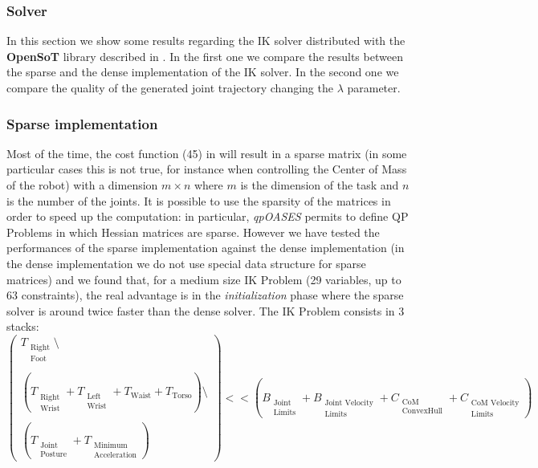 \subsubsection{Solver}
In this section we show some results regarding the IK solver distributed with the \textbf{OpenSoT} library described in \cite{rocchimingo:16}. In the first one we compare the results between the sparse and the dense implementation of the IK solver. In the second one we compare the quality of the generated joint trajectory changing the $\lambda$ parameter. 

\subsubsection{Sparse implementation}
Most of the time, the cost function (45) in \cite{rocchimingo:16}
will result in a sparse matrix (in some particular cases this is not true, for instance when controlling the Center of Mass of the robot) with a dimension $m \times n$ where $m$ is the dimension of the task and $n$ is the number of the joints.  
It is possible to use the sparsity of the matrices in order to speed up the computation: in particular, \emph{qpOASES} permits to define QP Problems in which Hessian matrices are sparse. However we have tested the performances of the sparse implementation against the dense implementation (in the dense implementation we do not use special data structure for sparse matrices) and we found that, for a medium size IK Problem (29 variables, up to 63 constraints), the real advantage is in the \emph{initialization} phase where the sparse solver is around twice faster than the dense solver. The IK Problem consists in 3 stacks: 
\begin{equation}
\begin{pmatrix}
T_{\substack{\text{Right}\\\text{Foot}}}\setminus\\
\\
\left(T_{\substack{\text{Right}\\\text{Wrist}}} + T_{\substack{\text{Left}\\\text{Wrist}}} + T_\text{Waist} + T_\text{Torso}\right)\setminus\\ 
\\
\left(T_{\substack{\text{Joint}\\\text{Posture}}} + T_{\substack{\text{Minimum}\\\text{Acceleration}}}\right)
\end{pmatrix}
<< \left(B_{\substack{\text{Joint}\\\text{Limits}}} + B_{\substack{\text{Joint Velocity}\\\text{Limits}}} + C_{\substack{\text{CoM}\\\text{ConvexHull}}} 
+ C_{\substack{\text{CoM Velocity}\\\text{Limits}}}\right)
\end{equation}

